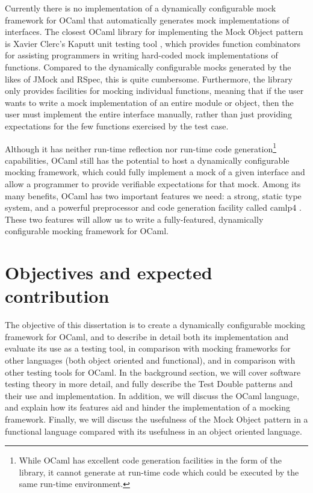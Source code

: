 Currently there is no implementation of a dynamically configurable
mock framework for OCaml that automatically generates mock
implementations of interfaces. The closest OCaml library for
implementing the Mock Object pattern is Xavier Clerc's Kaputt unit
testing tool \cite{www:kaputt}, which provides function combinators
for assisting programmers in writing hard-coded mock implementations
of functions. Compared to the dynamically configurable mocks generated
by the likes of JMock and RSpec, this is quite
cumbersome. Furthermore, the library only provides facilities for
mocking individual functions, meaning that if the user wants to write
a mock implementation of an entire module or object, then the user
must implement the entire interface manually, rather than just
providing expectations for the few functions exercised by the test
case.

Although it has neither run-time reflection nor run-time code
generation\footnote{While OCaml has excellent code generation
  facilities in the form of the  library, it
  cannot generate at run-time code which could be executed by the same
  run-time environment.} capabilities, OCaml still has the potential
to host a dynamically configurable mocking framework, which could
fully implement a mock of a given interface and allow a programmer to
provide verifiable expectations for that mock. Among its many
benefits, OCaml has two important features we need: a strong, static
type system, and a powerful preprocessor and code generation facility
called camlp4 \cite{www:camlp4}. These two features will allow us to
write a fully-featured, dynamically configurable mocking framework for
OCaml.

\section{Objectives and expected contribution}

The objective of this dissertation is to create a dynamically
configurable mocking framework for OCaml, and to describe in detail
both its implementation and evaluate its use as a testing tool, in
comparison with mocking frameworks for other languages (both object
oriented and functional), and in comparison with other testing tools
for OCaml. In the background section, we will cover software testing
theory in more detail, and fully describe the Test Double patterns and
their use and implementation. In addition, we will discuss the OCaml
language, and explain how its features aid and hinder the
implementation of a mocking framework. Finally, we will discuss the
usefulness of the Mock Object pattern in a functional language
compared with its usefulness in an object oriented language.
